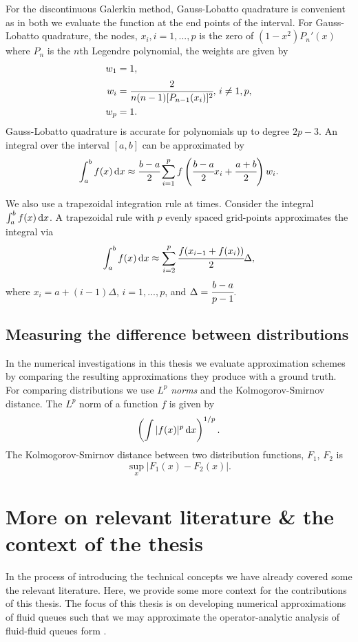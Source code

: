 For the discontinuous Galerkin method, Gauss-Lobatto quadrature is convenient as in both we evaluate the function at the end points of the interval. For Gauss-Lobatto quadrature, the nodes, \(x_i, i=1,...,p\) is the zero of \((1-x^2)P_n'(x)\) where \(P_n\) is the \(n\)th Legendre polynomial, the weights are given by 
\begin{align*}
	w_1&=1,
	\\w_i&=\cfrac{2}{n(n-1)[P_{n-1}(x_i)]^2}, \, i\neq 1, p,
	\\w_p&=1.
\end{align*}
Gauss-Lobatto quadrature is accurate for polynomials up to degree \(2p-3\). An integral over the interval \([a,b]\) can be approximated by 
\[\int_{a}^bf(x)\, \mathrm{d} x \approx \cfrac{b-a}{2}\sum_{i=1}^p f\left(\cfrac{b-a}{2}x_i+\cfrac{a+b}{2}\right)w_i.\]

We also use a trapezoidal integration rule at times. Consider the integral \(\int_{a}^bf(x)\, \mathrm{d} x\). A trapezoidal rule with \(p\) evenly spaced grid-points approximates the integral via 
\[\int_{a}^bf(x)\, \mathrm{d} x \approx \sum_{i=2}^p \cfrac{f(x_{i-1}+f(x_i))}{2}\Delta,\]
where \(x_i=a+(i-1)\Delta\), \(i=1,...,p\), and \(\Delta = \cfrac{b-a}{p-1}.\) 

\subsection*{Measuring the difference between distributions}
In the numerical investigations in this thesis we evaluate approximation schemes by comparing the resulting approximations they produce with a ground truth. For comparing distributions we use \(L^p\) \emph{norms} and the Kolmogorov-Smirnov distance. The \(L^p\) norm of a function \(f\) is given by 
\[\left(\int |f(x)|^p\, \mathrm{d} x\right)^{1/p}.\]
The Kolmogorov-Smirnov distance between two distribution functions, \(F_1\), \(F_2\) is 
\[\sup_{x}|F_1(x)-F_2(x)|.\]

\section{More on relevant literature \& the context of the thesis} 
In the process of introducing the technical concepts we have already covered some the relevant literature. Here, we provide some more context for the contributions of this thesis. The focus of this thesis is on developing numerical approximations of fluid queues such that we may approximate the operator-analytic analysis of fluid-fluid queues form \cite{bo2014}. %

